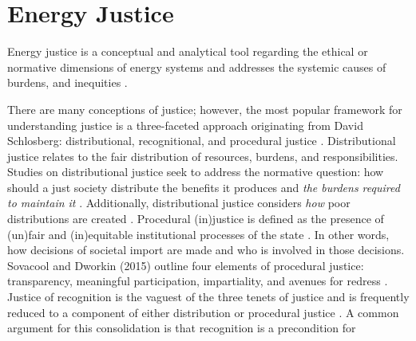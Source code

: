 \section{Energy Justice}



Energy justice is a conceptual and analytical tool regarding the ethical or
normative dimensions of energy systems and addresses the systemic causes of
burdens, and inequities \cite{sovacool_energy_2015}.

    
    There are many conceptions of justice; however, the most popular framework
    for understanding justice is a three-faceted approach originating from David
    Schlosberg: distributional, recognitional, and procedural justice
    \cite{schlosberg_2_2007}.
    Distributional justice relates to the fair distribution of resources,
    burdens, and responsibilities. Studies on distributional justice seek to
    address the normative question: how should a just society distribute the
    benefits it produces and \textit{the burdens required to maintain it}
    \cite{brighouse_justice_2004}. Additionally, distributional justice
    considers \textit{how} poor distributions are created
    \cite{schlosberg_2_2007}.
    Procedural (in)justice is defined as the presence of (un)fair and
    (in)equitable institutional processes of the state \cite{schlosberg_2_2007}.
    In other words, how decisions of societal import are made and who is
    involved in those decisions. Sovacool and Dworkin (2015) outline four
    elements of procedural justice: transparency, meaningful participation,
    impartiality, and avenues for redress \cite{sovacool_energy_2015}.    
Justice of recognition is the vaguest of the three tenets of justice and is
    frequently reduced to a component of either distribution or procedural
    justice \cite{schlosberg_2_2007, van_uffelen_revisiting_2022}. A common
    argument for this consolidation is that recognition is a precondition for
